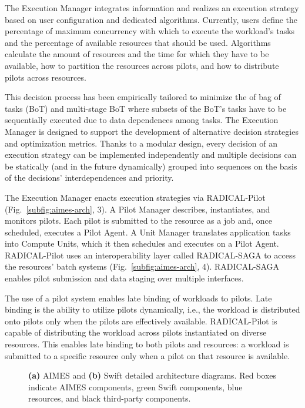 \documentclass[10pt, conference, compsocconf]{IEEEtran}
\newcommand{\B}[1]{\textbf{#1}\xspace}
\begin{document}
The Execution Manager integrates information and realizes an execution strategy
based on user configuration and dedicated algorithms. Currently, users define
the percentage of maximum concurrency with which to execute the workload's tasks
and the percentage of available resources that should be used. Algorithms
calculate the amount of resources and the time for which they have to be
available, how to partition the resources across pilots, and how to distribute
pilots across resources.

This decision process has been empirically tailored to minimize the  of
bag of tasks (BoT) and multi-stage BoT where subsets of the BoT's tasks have to
be sequentially executed due to data dependences among tasks. The Execution
Manager is designed to support the development of alternative decision
strategies and optimization metrics. Thanks to a modular design, every decision
of an execution strategy can be implemented independently and multiple decisions
can be statically (and in the future dynamically) grouped into sequences on the
basis of the decisions' interdependences and priority.

The Execution Manager enacts execution strategies via RADICAL-Pilot
(Fig.~\ref{subfig:aimes-arch}, 3). A Pilot Manager describes, instantiates, and
monitors pilots. Each pilot is submitted to the resource as a job and, once
scheduled, executes a Pilot Agent. A Unit Manager translates application tasks
into Compute Units, which it then schedules and executes on a Pilot Agent.
RADICAL-Pilot uses an interoperability layer called RADICAL-SAGA to access the
resources' batch systems (Fig.~\ref{subfig:aimes-arch}, 4). RADICAL-SAGA enables
pilot submission and data staging over multiple interfaces.

The use of a pilot system enables late binding of workloads to pilots. Late
binding is the ability to utilize pilots dynamically, i.e., the workload is
distributed onto pilots only when the pilots are effectively available.
RADICAL-Pilot is capable of distributing the workload across pilots instantiated
on diverse resources. This enables late binding to both pilots and resources: a
workload is submitted to a specific resource only when a pilot on that resource
is available.

\begin{figure}[t]
  \caption{ \B{(a)} AIMES and \B{(b)} Swift detailed architecture diagrams.
            Red boxes indicate AIMES components, green Swift components, blue
            resources, and black third-party components.\label{fig:archs}}
\end{figure}
\end{document}
